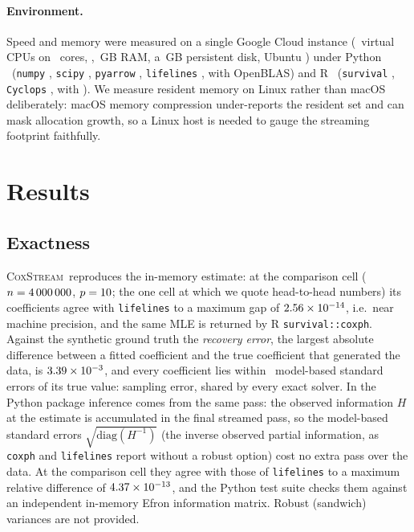 \documentclass[11pt,a4paper]{article}
\newcommand{\coxstream}{\textsc{CoxStream}}
\begin{document}
\paragraph{Environment.} Speed and memory were measured on a single Google Cloud
\texttt{\EnvMachine} instance (\EnvVCPUs\ virtual CPUs on \EnvCores\ cores, \EnvCPU,
\EnvRAMGB\,GB RAM, a \EnvDiskGB\,GB persistent disk, Ubuntu \EnvUbuntu) under
Python \EnvPython\ (\texttt{numpy} \EnvNumPy, \texttt{scipy} \EnvSciPy, \texttt{pyarrow}
\EnvPyarrow, \texttt{lifelines} \EnvLifelines, with OpenBLAS) and R \EnvR\
(\texttt{survival} \EnvSurvival, \texttt{Cyclops} \EnvCyclops, with
\EnvRBLAS). We measure resident
memory on Linux rather than macOS deliberately: macOS memory compression
under-reports the resident set and can mask allocation growth, so a Linux host
is needed to gauge the streaming footprint faithfully.

\section{Results}
\label{sec:results}

\subsection{Exactness}
\coxstream\ reproduces the in-memory estimate: at the comparison cell
($n = 4\,000\,000$, $p=10$; the one cell at which we quote
head-to-head numbers) its coefficients agree with \texttt{lifelines}
to a maximum gap of $2.56 \times 10^{-14}$, i.e.\ near machine precision, and the
same MLE is returned by R \texttt{survival::coxph}.
Against the synthetic ground truth the \emph{recovery error}, the largest
absolute difference between a fitted coefficient and the true coefficient that
generated the data, is $3.39 \times 10^{-3}$, and every coefficient lies within
\CoxStreamMaxErrSE\ model-based standard errors of its true value: sampling
error, shared by every exact solver. In the Python package inference comes
from the same pass: the observed information $H$ at the estimate is
accumulated in the final streamed pass, so the model-based
standard errors $\sqrt{\mathrm{diag}(H^{-1})}$ (the inverse observed partial
information, as \texttt{coxph} and \texttt{lifelines} report without a robust
option) cost no extra pass over the data. At the comparison cell they agree
with those of \texttt{lifelines} to a maximum relative difference of
$4.37 \times 10^{-13}$, and the Python test suite checks them against an
independent in-memory Efron information matrix. Robust (sandwich) variances
are not provided.
\end{document}
